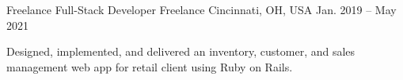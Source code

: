 \begin{cventries}

	\cventry
	{Freelance Full-Stack Developer} %
	{Freelance} %
	{Cincinnati, OH, USA} %
	{Jan. 2019 -- May 2021} %
	{
		\begin{cvitems}
			\item Designed, implemented, and delivered an inventory, customer, and
			sales management web app for retail client using Ruby on Rails.
		\end{cvitems}
	}

\end{cventries}
